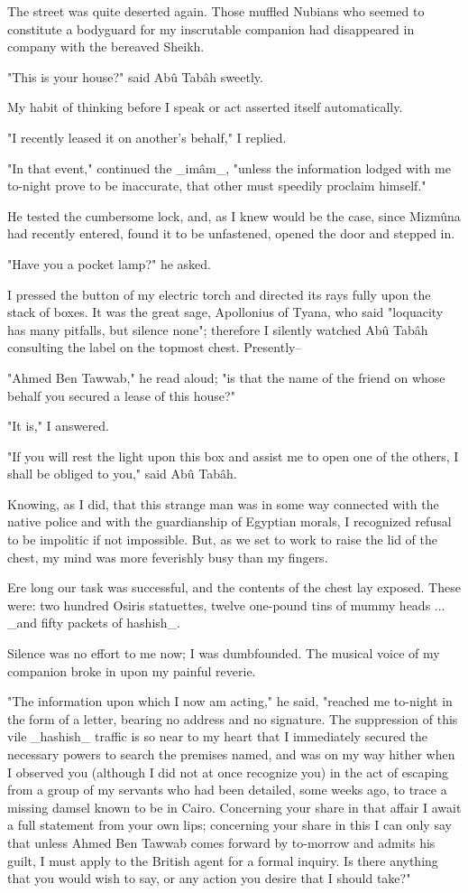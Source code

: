 The street was quite deserted again. Those muffled Nubians who seemed
to constitute a bodyguard for my inscrutable companion had disappeared
in company with the bereaved Sheikh.

"This is your house?" said Abû Tabâh sweetly.

My habit of thinking before I speak or act asserted itself
automatically.

"I recently leased it on another's behalf," I replied.

"In that event," continued the _imâm_, "unless the information lodged
with me to-night prove to be inaccurate, that other must speedily
proclaim himself."

He tested the cumbersome lock, and, as I knew would be the case, since
Mizmûna had recently entered, found it to be unfastened, opened the
door and stepped in.

"Have you a pocket lamp?" he asked.

I pressed the button of my electric torch and directed its rays fully
upon the stack of boxes. It was the great sage, Apollonius of Tyana,
who said "loquacity has many pitfalls, but silence none"; therefore I
silently watched Abû Tabâh consulting the label on the topmost chest.
Presently--

"Ahmed Ben Tawwab," he read aloud; "is that the name of the friend on
whose behalf you secured a lease of this house?"

"It is," I answered.

"If you will rest the light upon this box and assist me to open one of
the others, I shall be obliged to you," said Abû Tabâh.

Knowing, as I did, that this strange man was in some way connected
with the native police and with the guardianship of Egyptian morals,
I recognized refusal to be impolitic if not impossible. But, as we set
to work to raise the lid of the chest, my mind was more feverishly
busy than my fingers.

Ere long our task was successful, and the contents of the chest lay
exposed. These were: two hundred Osiris statuettes, twelve one-pound
tins of mummy heads ... _and fifty packets of hashish_.

Silence was no effort to me now; I was dumbfounded. The musical voice
of my companion broke in upon my painful reverie.

"The information upon which I now am acting," he said, "reached me
to-night in the form of a letter, bearing no address and no
signature. The suppression of this vile _hashish_ traffic is so near
to my heart that I immediately secured the necessary powers to search
the premises named, and was on my way hither when I observed you
(although I did not at once recognize you) in the act of escaping from
a group of my servants who had been detailed, some weeks ago, to trace
a missing damsel known to be in Cairo. Concerning your share in that
affair I await a full statement from your own lips; concerning your
share in this I can only say that unless Ahmed Ben Tawwab comes
forward by to-morrow and admits his guilt, I must apply to the British
agent for a formal inquiry. Is there anything that you would wish to
say, or any action you desire that I should take?"

